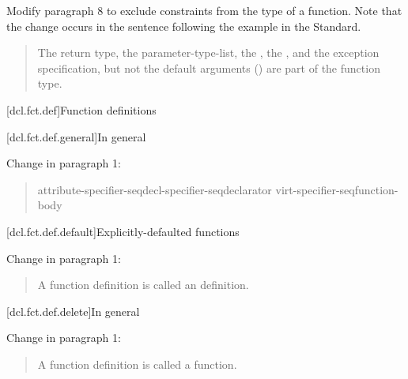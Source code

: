 Modify paragraph 8 to exclude constraints from the type of a function.
Note that the change occurs in the sentence following the example
in the \Cpp Standard.

\begin{quote}
\setcounter{Paras}{7}
\pnum
The return type, the parameter-type-list, the , 
the , and the exception specification, but not 
the default arguments ()
are part of the function type.
\end{quote}

\setcounter{section}{4}
[dcl.fct.def]{Function definitions}

[dcl.fct.def.general]{In general}

Change in paragraph 1:

\begin{quote}
\begin{bnf}
\br
  attribute-specifier-seq\opt decl-specifier-seq\opt declarator virt-specifier-seq\opt function-body\br
\end{bnf}
\end{quote}

[dcl.fct.def.default]{Explicitly-defaulted functions}

Change in paragraph 1:

\begin{quote}
A function definition  
is called an  definition.
\end{quote}

[dcl.fct.def.delete]{In general}

Change in paragraph 1:

\begin{quote}
A function definition  
is called a  function.
\end{quote}
